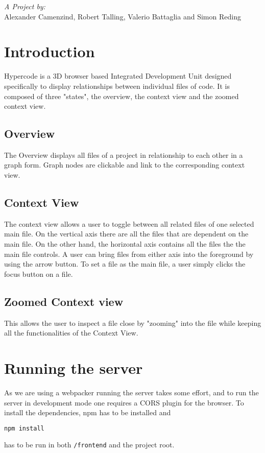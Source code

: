\documentclass[a4paper]{article}
\author{\realauthor \\
Universit\`a della Svizzera italiana - \coursename}
\title{\assingmentnr}
\begin{document}
\maketitle{\raggedleft}
\emph{A Project by:}\\
Alexander Camenzind, Robert Talling, Valerio Battaglia and Simon Reding


\section{Introduction}
Hypercode is a 3D browser based Integrated Development Unit designed specifically to display relationships between individual files of code. It is composed of three "states", the overview, the context view and the zoomed context view.
\subsection{Overview}
The Overview displays all files of a project in relationship to each other in a graph form. Graph nodes are clickable and link to the corresponding context view.
\subsection{Context View}
The context view allows a user to toggle between all related files of one selected main file. On the vertical axis there are all the files that are dependent on the main file. On the other hand, the horizontal axis contains all the files the the main file controls. A user can bring files from either axis into the foreground by using the arrow button. To set a file as the main file, a user simply clicks the focus button on a file. 

\subsection{Zoomed Context view}
This allows the user to inspect a file close by "zooming" into the file while keeping all the functionalities of the Context View.

\section{Running the server}
As we are using a webpacker running the server takes some effort, and to run the server in development mode one requires a CORS plugin for the browser. To install the dependencies, npm has to be installed and
\begin{lstlisting}[language=bash]
npm install
\end{lstlisting}
has to be run in both \texttt{/frontend} and the project root.
\end{document}

